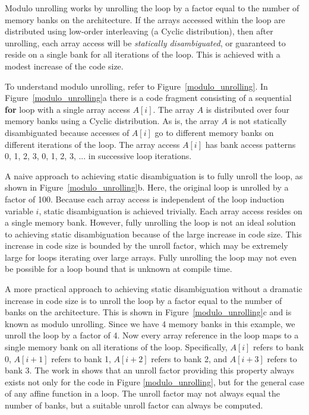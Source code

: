 Modulo unrolling works by unrolling the loop by a factor equal to the number of memory banks on the architecture. If the arrays accessed within the loop are distributed using low-order interleaving (a Cyclic distribution), then after unrolling, each array access will be \textit{statically disambiguated}, or guaranteed to reside on a single bank for all iterations of the loop. This is achieved with a modest increase of the code size. 

To understand modulo unrolling, refer to Figure~\ref{modulo_unrolling}. In Figure~\ref{modulo_unrolling}a there is a code fragment consisting of a sequential \textbf{for} loop with a single array access $A[i]$. The array $A$ is distributed over four memory banks using a Cyclic distribution. As is, the array $A$ is not statically disambiguated because accesses of $A[i]$ go to different memory banks on different iterations of the loop. The array access $A[i]$ has bank access patterns 0, 1, 2, 3, 0, 1, 2, 3, ... in successive loop iterations. 

A naive approach to achieving static disambiguation is to fully unroll the loop, as shown in Figure~\ref{modulo_unrolling}b. Here, the original loop is unrolled by a factor of 100. Because each array access is independent of the loop induction variable $i$, static disambiguation is achieved trivially. Each array access resides on a single memory bank. However, fully unrolling the loop is not an ideal solution to achieving static disambiguation because of the large increase in code size. This increase in code size is bounded by the unroll factor, which may be extremely large for loops iterating over large arrays. Fully unrolling the loop may not even be possible for a loop bound that is unknown at compile time. 

A more practical approach to achieving static disambiguation without a dramatic increase in code size is to unroll the loop by a factor equal to the number of banks on the architecture. This is shown in Figure~\ref{modulo_unrolling}c and is known as modulo unrolling. Since we have 4 memory banks in this example, we unroll the loop by a factor of 4. Now every array reference in the loop maps to a single memory bank on all iterations of the loop. Specifically, $A[i]$ refers to bank 0, $A[i+1]$ refers to bank 1, $A[i+2]$ refers to bank 2, and $A[i+3]$ refers to bank 3. The work in \cite{barua1999maps} shows that an unroll factor providing this property always exists not only for the code in Figure \ref{modulo_unrolling}, but for the general case of any affine function in a loop.  The unroll factor may not always equal the number of banks, but a suitable unroll factor can always be computed.

